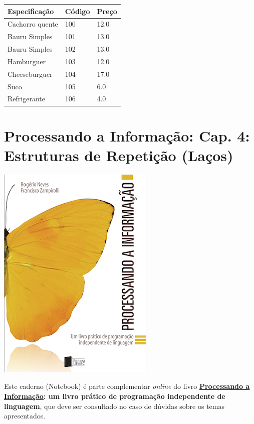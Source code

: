 \documentclass[12pt,a4paper]{article}
\begin{document}
\begin{longtable}[]{@{}lll@{}}
\toprule()
Especificação & Código & Preço \\
\midrule()
\endhead
Cachorro quente & 100 & 12.0 \\
Bauru Simples & 101 & 13.0 \\
Bauru Simples & 102 & 13.0 \\
Hamburguer & 103 & 12.0 \\
Cheeseburguer & 104 & 17.0 \\
Suco & 105 & 6.0 \\
Refrigerante & 106 & 4.0 \\
\bottomrule()
\end{longtable}

    \hypertarget{processando-a-informauxe7uxe3o-cap.-4-estruturas-de-repetiuxe7uxe3o-lauxe7os}{%
\section{Processando a Informação: Cap. 4: Estruturas de Repetição
(Laços)}\label{processando-a-informauxe7uxe3o-cap.-4-estruturas-de-repetiuxe7uxe3o-lauxe7os}}

    \includegraphics{"figs/Capa_Processando_Informacao.jpg"}

Este caderno (Notebook) é parte complementar \emph{online} do livro
\textbf{\href{https://editora.ufabc.edu.br/matematica-e-ciencias-da-computacao/58-processando-a-informacao}{Processando
a Informação}: um livro prático de programação independente de
linguagem}, que deve ser consultado no caso de dúvidas sobre os temas
apresentados.
\end{document}
